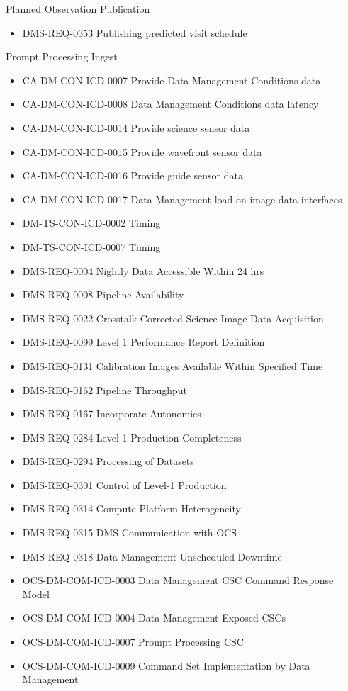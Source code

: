 Planned Observation Publication \begin{itemize}
\item DMS-REQ-0353 Publishing predicted visit schedule
\end{itemize}
Prompt Processing Ingest \begin{itemize}
\item CA-DM-CON-ICD-0007 Provide Data Management Conditions data
\item CA-DM-CON-ICD-0008 Data Management Conditions data latency
\item CA-DM-CON-ICD-0014 Provide science sensor data
\item CA-DM-CON-ICD-0015 Provide wavefront sensor data
\item CA-DM-CON-ICD-0016 Provide guide sensor data
\item CA-DM-CON-ICD-0017 Data Management load on image data interfaces
\item DM-TS-CON-ICD-0002 Timing
\item DM-TS-CON-ICD-0007 Timing
\item DMS-REQ-0004 Nightly Data Accessible Within 24 hrs
\item DMS-REQ-0008 Pipeline Availability
\item DMS-REQ-0022 Crosstalk Corrected Science Image Data Acquisition
\item DMS-REQ-0099 Level 1 Performance Report Definition
\item DMS-REQ-0131 Calibration Images Available Within Specified Time
\item DMS-REQ-0162 Pipeline Throughput
\item DMS-REQ-0167 Incorporate Autonomics
\item DMS-REQ-0284 Level-1 Production Completeness
\item DMS-REQ-0294 Processing of Datasets
\item DMS-REQ-0301 Control of Level-1 Production
\item DMS-REQ-0314 Compute Platform Heterogeneity
\item DMS-REQ-0315 DMS Communication with OCS
\item DMS-REQ-0318 Data Management Unscheduled Downtime
\item OCS-DM-COM-ICD-0003 Data Management CSC Command Response Model
\item OCS-DM-COM-ICD-0004 Data Management Exposed CSCs
\item OCS-DM-COM-ICD-0007 Prompt Processing CSC
\item OCS-DM-COM-ICD-0009 Command Set Implementation by Data Management

\end{itemize}
